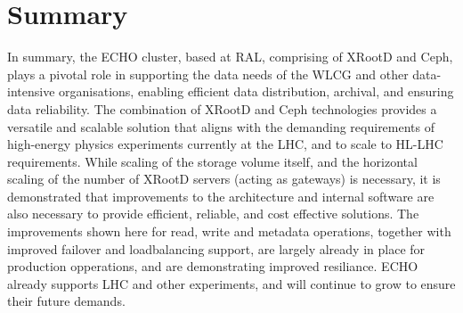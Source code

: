 \documentclass{webofc}
\begin{document}
\section{Summary\label{summary}}
In summary, the ECHO cluster, based at RAL, comprising of XRootD and Ceph,  plays a pivotal role in supporting the data needs of the WLCG and other data-intensive organisations, enabling efficient data distribution, archival, and ensuring data reliability. The combination of XRootD and Ceph technologies provides a versatile and scalable solution that aligns with the demanding requirements of high-energy physics experiments currently at the LHC, and to scale to HL-LHC requirements. 
While scaling of the storage volume itself, and the horizontal scaling of the number of XRootD servers (acting as gateways) is necessary, it is demonstrated that improvements to the architecture and internal software are also necessary to provide efficient, reliable, and cost effective solutions. 
The improvements shown here for read, write and metadata operations, together with improved failover and loadbalancing support, are largely already in place for production opperations, and are demonstrating improved resiliance. 
ECHO already supports LHC and other experiments, and will continue to grow to ensure their future demands. 



\end{document}
